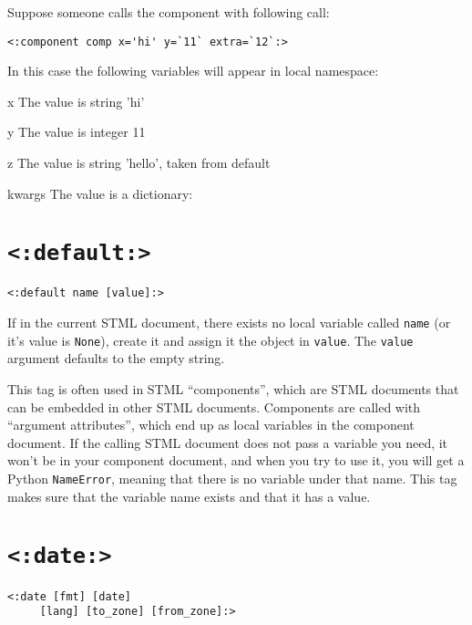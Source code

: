 \documentclass{manual}
\begin{document}
Suppose someone calls the component with following call: 

\begin{verbatim}
<:component comp x='hi' y=`11` extra=`12`:>
\end{verbatim}


In this case the following variables will appear in local namespace:
\begin{argdesc}
\item[x] The value is string 'hi'
\item[y] The value is integer 11
\item[z] The value is string 'hello', taken from default 
\item[kwargs] The value is a dictionary: 
\end{argdesc}

 

\section{\texttt{<:default:>}}
\label{tagdefault}

\begin{verbatim}
<:default name [value]:>
\end{verbatim}

If in the current STML document, there exists no local variable called
\texttt{name} (or it's value is \texttt{None}), create it and assign
it the object in \texttt{value}. The \texttt{value} argument defaults
to the empty string.

This tag is often used in STML ``components'', which are STML
documents that can be embedded in other STML documents. Components
are called with ``argument attributes'', which end up as local
variables in the component document. If the calling STML document
does not pass a variable you need, it won't be in your component
document, and when you try to use it, you will get a Python
\texttt{NameError}, meaning that there is no variable under that
name. This tag makes sure that the variable name exists and that
it has a value.


\section{\texttt{<:date:>}}
\label{tagdate}

\begin{verbatim}
<:date [fmt] [date] 
     [lang] [to_zone] [from_zone]:>
\end{verbatim}
\end{document}
